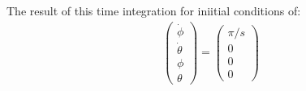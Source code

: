 The result of this time integration for iniitial conditions of:
\begin{equation}
    \begin{split}
        \begin{pmatrix}
            \dot \phi\\
            \dot \theta\\
            \phi\\
            \theta
        \end{pmatrix} = \begin{pmatrix}
            \pi /s\\
            0\\
            0\\
            0
        \end{pmatrix}
    \end{split}
\end{equation}
\clearpage %

